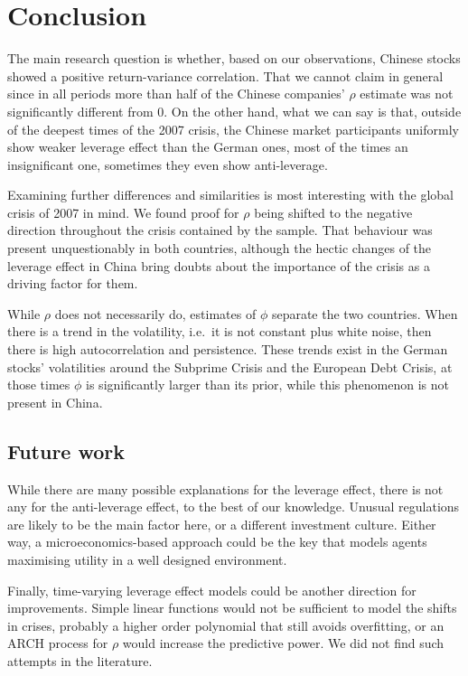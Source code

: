 \section{Conclusion}

The main research question is whether, based on our observations, Chinese stocks showed a positive return-variance correlation.
That we cannot claim in general since in all periods more than half of the Chinese companies' $\rho$ estimate was not significantly different from 0.
On the other hand, what we can say is that, outside of the deepest times of the 2007 crisis, the Chinese market participants uniformly show weaker leverage effect than the German ones, most of the times an insignificant one, sometimes they even show anti-leverage.

Examining further differences and similarities is most interesting with the global crisis of 2007 in mind.
We found proof for $\rho$ being shifted to the negative direction throughout the crisis contained by the sample.
That behaviour was present unquestionably in both countries, although the hectic changes of the leverage effect in China bring doubts about the importance of the crisis as a driving factor for them.

While $\rho$ does not necessarily do, estimates of $\phi$ separate the two countries.
When there is a trend in the volatility, i.e.\ it is not constant plus white noise, then there is high autocorrelation and persistence.
These trends exist in the German stocks' volatilities around the Subprime Crisis and the European Debt Crisis, at those times $\phi$ is significantly larger than its prior, while this phenomenon is not present in China.

\subsection{Future work}

While there are many possible explanations for the leverage effect, there is not any for the anti-leverage effect, to the best of our knowledge.
Unusual regulations are likely to be the main factor here, or a different investment culture.
Either way, a microeconomics-based approach could be the key that models agents maximising utility in a well designed environment.

Finally, time-varying leverage effect models could be another direction for improvements.
Simple linear functions would not be sufficient to model the shifts in crises, probably a higher order polynomial that still avoids overfitting, or an ARCH process for $\rho$ would increase the predictive power.
We did not find such attempts in the literature.

